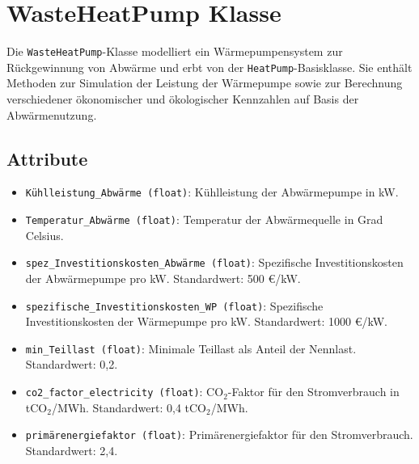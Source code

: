 \section{WasteHeatPump Klasse}
Die \texttt{WasteHeatPump}-Klasse modelliert ein Wärmepumpensystem zur Rückgewinnung von Abwärme und erbt von der \texttt{HeatPump}-Basisklasse. Sie enthält Methoden zur Simulation der Leistung der Wärmepumpe sowie zur Berechnung verschiedener ökonomischer und ökologischer Kennzahlen auf Basis der Abwärmenutzung.

\subsection{Attribute}
\begin{itemize}
    \item \texttt{Kühlleistung\_Abwärme (float)}: Kühlleistung der Abwärmepumpe in kW.
    \item \texttt{Temperatur\_Abwärme (float)}: Temperatur der Abwärmequelle in Grad Celsius.
    \item \texttt{spez\_Investitionskosten\_Abwärme (float)}: Spezifische Investitionskosten der Abwärmepumpe pro kW. Standardwert: 500 €/kW.
    \item \texttt{spezifische\_Investitionskosten\_WP (float)}: Spezifische Investitionskosten der Wärmepumpe pro kW. Standardwert: 1000 €/kW.
    \item \texttt{min\_Teillast (float)}: Minimale Teillast als Anteil der Nennlast. Standardwert: 0,2.
    \item \texttt{co2\_factor\_electricity (float)}: CO$_2$-Faktor für den Stromverbrauch in tCO$_2$/MWh. Standardwert: 0,4 tCO$_2$/MWh.
    \item \texttt{primärenergiefaktor (float)}: Primärenergiefaktor für den Stromverbrauch. Standardwert: 2,4.
\end{itemize}

